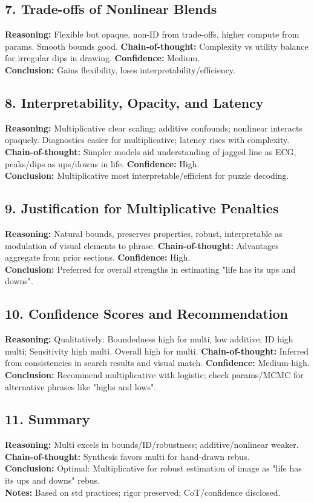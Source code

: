 \documentclass{article}
\begin{document}
\subsection{7. Trade-offs of Nonlinear Blends}
\textbf{Reasoning:} Flexible but opaque, non-ID from trade-offs, higher compute from params. Smooth bounds good. \textbf{Chain-of-thought:} Complexity vs utility balance for irregular dips in drawing. \textbf{Confidence:} Medium.\\
\textbf{Conclusion:} Gains flexibility, loses interpretability/efficiency.

\subsection{8. Interpretability, Opacity, and Latency}
\textbf{Reasoning:} Multiplicative clear scaling; additive confounds; nonlinear interacts opaquely. Diagnostics easier for multiplicative; latency rises with complexity. \textbf{Chain-of-thought:} Simpler models aid understanding of jagged line as ECG, peaks/dips as ups/downs in life. \textbf{Confidence:} High.\\
\textbf{Conclusion:} Multiplicative most interpretable/efficient for puzzle decoding.

\subsection{9. Justification for Multiplicative Penalties}
\textbf{Reasoning:} Natural bounds, preserves properties, robust, interpretable as modulation of visual elements to phrase. \textbf{Chain-of-thought:} Advantages aggregate from prior sections. \textbf{Confidence:} High.\\
\textbf{Conclusion:} Preferred for overall strengths in estimating "life has its ups and downs".

\subsection{10. Confidence Scores and Recommendation}
\textbf{Reasoning:} Qualitatively: Boundedness high for multi, low additive; ID high multi; Sensitivity high multi. Overall high for multi. \textbf{Chain-of-thought:} Inferred from consistencies in search results and visual match. \textbf{Confidence:} Medium-high.\\
\textbf{Conclusion:} Recommend multiplicative with logistic; check params/MCMC for alternative phrases like "highs and lows".

\subsection{11. Summary}
\textbf{Reasoning:} Multi excels in bounds/ID/robustness; additive/nonlinear weaker. \textbf{Chain-of-thought:} Synthesis favors multi for hand-drawn rebus.\\
\textbf{Conclusion:} Optimal: Multiplicative for robust estimation of image as "life has its ups and downs" rebus.\\
\textbf{Notes:} Based on std practices; rigor preserved; CoT/confidence disclosed.
\end{document}
